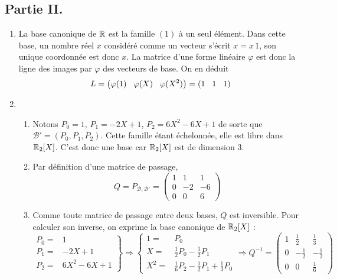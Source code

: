 \subsection*{Partie II.}
\begin{enumerate}
  \item La base canonique de $\mathbb{R}$ est la famille $(1)$ à un seul élément. Dans cette base, un nombre réel $x$ considéré comme un vecteur s'écrit $x = x\, 1$, son unique coordonnée est donc $x$. La matrice d'une forme linéaire $\varphi$ est donc la ligne des images par $\varphi$ des vecteurs de base. On en déduit
\begin{displaymath}
 L =
\left( 
 \varphi(1) \hspace{0.3cm} \varphi(X) \hspace{0.3cm} \varphi(X^2)
\right) 
=
\left( 
 1 \hspace{0.3cm} 1 \hspace{0.3cm} 1
\right) 
\end{displaymath}

 \item 
\begin{enumerate}
\item Notons $P_0 = 1$, $P_1 = -2X + 1$, $P_2 = 6X^2 - 6X + 1$ de sorte que $\mathcal{B}' = (P_0, P_1, P_2)$. Cette famille étant échelonnée, elle est libre dans $\mathbb{R}_2[X]$. C'est donc une base car $\mathbb{R}_2[X]$ est de dimension 3. 

\item Par définition d'une matrice de passage,
\renewcommand{\arraystretch}{1.}
\begin{displaymath}
 Q = P_{\mathcal{B}, \mathcal{B}'}=
\begin{pmatrix}
 1 & 1 & 1 \\ 0 & -2 & -6 \\ 0 & 0 & 6
\end{pmatrix}
\end{displaymath}

\item Comme toute matrice de passage entre deux bases, $Q$ est inversible. Pour calculer son inverse, on exprime la base canonique de $\mathbb{R}_2[X]$ :
\renewcommand{\arraystretch}{1.3}
\begin{displaymath}
\left. 
\begin{aligned}
 P_0 =& 1 \\ P_1 =& -2X + 1 \\ P_2 =& 6X^2 - 6X + 1
\end{aligned}
\right\rbrace \Rightarrow
\left\lbrace 
\begin{aligned}
 1 =& P_0 \\ X=& \frac{1}{2}P_0 - \frac{1}{2}P_1 \\ X^2 =& \frac{1}{6}P_2 -\frac{1}{2}P_1 + \frac{1}{3}P_0 
\end{aligned}
\right. 
\Rightarrow 
Q^{-1}=
\begin{pmatrix}
 1 & \frac{1}{2} & \frac{1}{3}\\ 0 & -\frac{1}{2} & -\frac{1}{2} \\ 0 & 0 & \frac{1}{6} 
\end{pmatrix} 
\end{displaymath}
\end{enumerate}
 

\end{enumerate}
